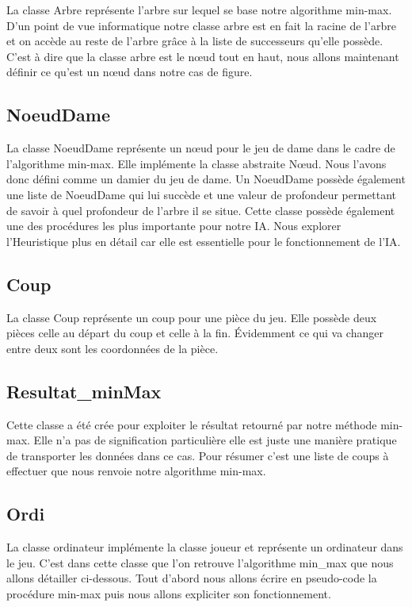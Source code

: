 \documentclass[12,french]{report}
\begin{document}
La classe Arbre représente l'arbre sur lequel se base notre algorithme min-max. D'un point de vue informatique notre classe arbre est en fait la racine de l'arbre et on accède au reste de l'arbre grâce à la liste de successeurs qu'elle possède. C'est à dire que la classe arbre est le nœud tout en haut, nous allons maintenant définir ce qu'est un nœud dans notre cas de figure.

\subsection{NoeudDame}

La classe NoeudDame représente un nœud pour le jeu de dame dans le cadre de l'algorithme min-max. Elle implémente la classe abstraite Nœud. Nous l'avons donc défini comme un damier du jeu de dame. Un NoeudDame possède également une liste de NoeudDame qui lui succède et une valeur de profondeur permettant de savoir à quel profondeur de l'arbre il se situe. Cette classe possède également une des procédures les plus importante pour notre IA. Nous explorer l'Heuristique plus en détail car elle est essentielle pour le fonctionnement de l'IA.

\subsection{Coup}

La classe Coup représente un coup pour une pièce du jeu. Elle possède deux pièces celle au départ du coup et celle à la fin. Évidemment ce qui va changer entre deux sont les coordonnées de la pièce.

\subsection{Resultat\_minMax}

Cette classe a été crée pour exploiter le résultat retourné par notre méthode min-max. Elle n'a pas de signification particulière elle est juste une manière pratique de transporter les données dans ce cas. Pour résumer c'est une liste de coups à effectuer que nous renvoie notre algorithme min-max.

\subsection{Ordi}

La classe ordinateur implémente la classe joueur et représente un ordinateur dans le jeu. C'est dans cette classe que l'on retrouve l'algorithme min\_max que nous allons détailler ci-dessous. Tout d'abord nous allons écrire en pseudo-code la procédure min-max puis nous allons expliciter son fonctionnement.
\end{document}
